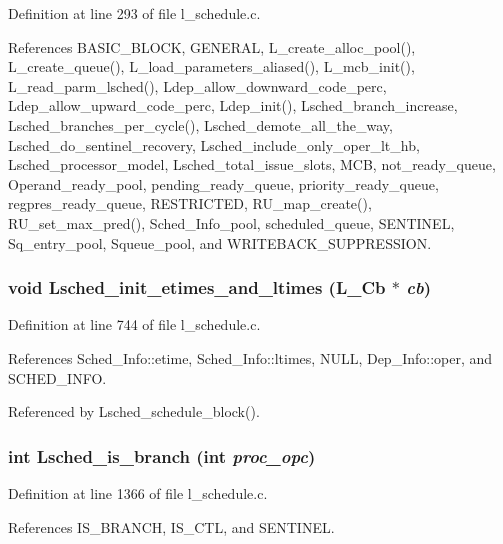 Definition at line 293 of file l\_\-schedule.c.

References BASIC\_\-BLOCK, GENERAL, L\_\-create\_\-alloc\_\-pool(), L\_\-create\_\-queue(), L\_\-load\_\-parameters\_\-aliased(), L\_\-mcb\_\-init(), L\_\-read\_\-parm\_\-lsched(), Ldep\_\-allow\_\-downward\_\-code\_\-perc, Ldep\_\-allow\_\-upward\_\-code\_\-perc, Ldep\_\-init(), Lsched\_\-branch\_\-increase, Lsched\_\-branches\_\-per\_\-cycle(), Lsched\_\-demote\_\-all\_\-the\_\-way, Lsched\_\-do\_\-sentinel\_\-recovery, Lsched\_\-include\_\-only\_\-oper\_\-lt\_\-hb, Lsched\_\-processor\_\-model, Lsched\_\-total\_\-issue\_\-slots, MCB, not\_\-ready\_\-queue, Operand\_\-ready\_\-pool, pending\_\-ready\_\-queue, priority\_\-ready\_\-queue, regpres\_\-ready\_\-queue, RESTRICTED, RU\_\-map\_\-create(), RU\_\-set\_\-max\_\-pred(), Sched\_\-Info\_\-pool, scheduled\_\-queue, SENTINEL, Sq\_\-entry\_\-pool, Squeue\_\-pool, and WRITEBACK\_\-SUPPRESSION.
\subsubsection{\setlength{\rightskip}{0pt plus 5cm}void Lsched\_\-init\_\-etimes\_\-and\_\-ltimes (L\_\-Cb $\ast$ {\em cb})}\label{l__schedule_8c_6c5b84bc622cfdd643bb13b29e9570d5}




Definition at line 744 of file l\_\-schedule.c.

References Sched\_\-Info::etime, Sched\_\-Info::ltimes, NULL, Dep\_\-Info::oper, and SCHED\_\-INFO.

Referenced by Lsched\_\-schedule\_\-block().
\subsubsection{\setlength{\rightskip}{0pt plus 5cm}int Lsched\_\-is\_\-branch (int {\em proc\_\-opc})}\label{l__schedule_8c_cc88d49ca4d88e9903f8f4becff22831}




Definition at line 1366 of file l\_\-schedule.c.

References IS\_\-BRANCH, IS\_\-CTL, and SENTINEL.

